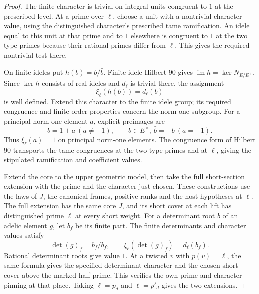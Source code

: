 \begin{proof}
The finite character is trivial on integral units congruent to \(1\)
at the prescribed level. At a prime over \(\ell\), choose
a unit with a nontrivial character value, using the
distinguished character's prescribed tame ramification.
An idele equal to this unit at that prime and to \(1\)
elsewhere is congruent to \(1\) at the two type primes
because their rational primes differ from \(\ell\).
This gives the required nontrivial test there.

On finite ideles put \(h(b)=b/\bar b\). Finite idele Hilbert
90 gives \(\operatorname{im}h=\ker N_{E/E^+}\). Since
\(\ker h\) consists of real ideles and \(d_\ell\) is trivial
there, the assignment
\[
 \xi_\ell(h(b))=d_\ell(b)
\]
is well defined. Extend this character to the finite idele
group; its required congruence and finite-order properties
concern the norm-one subgroup. For a principal norm-one
element \(a\), explicit preimages are
\[
 b=1+a\ (a\ne-1),\qquad
 b\in E^\times,\ \bar b=-b\ (a=-1).
\]
Thus \(\xi_\ell(a)=1\) on principal norm-one elements.
The congruence form of Hilbert 90 transports the tame
congruences at the two type primes and at \(\ell\), giving
the stipulated ramification and coefficient values.
\label{cor:completed-division-7}

Extend the core to the upper geometric model, then take the
full short-section extension with the prime and the
character just chosen. These constructions use the laws
of \(J\), the canonical frames, positive ranks and the
host hypotheses at \(\ell\). The full extension has the
same core \(J\), and its short cover at each lift has
distinguished prime \(\ell\) at every short weight.
For a determinant root \(b\) of an adelic element \(g\), let \(b_f\)
be its finite part. The finite determinants and character values satisfy
\[
 \det(g)_f=b_f/\bar b_f,\qquad
 \xi_\ell(\det(g)_f)=d_\ell(b_f).
\] Rational determinant roots give
value \(1\). At a twisted \(v\) with \(p(v)=\ell\), the
same formula gives the specified determinant character and
the chosen short cover above the marked half prime. This
verifies the own-prime and character pinning at that place.
Taking \(\ell=p_d\) and \(\ell=p'_d\) gives the two extensions.
\label{cor:completed-division-8}
\end{proof}



